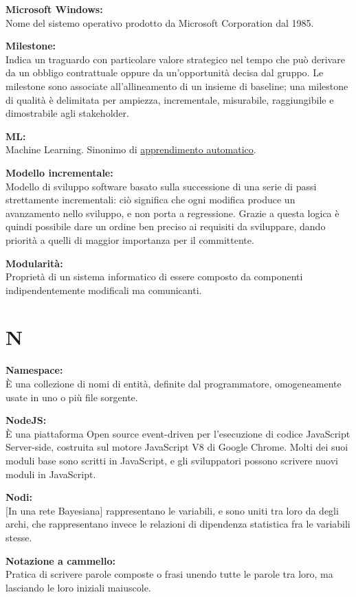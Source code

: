 \documentclass[a4paper, oneside, openany, dvipsnames, table]{article}
\begin{document}
\textbf{Microsoft Windows:}\\	Nome del sistemo operativo prodotto da Microsoft Corporation dal 1985.

\textbf{Milestone:}\\	Indica un traguardo con particolare valore strategico nel tempo che può derivare da un obbligo contrattuale oppure da un'opportunità decisa dal gruppo. Le milestone sono associate all'allineamento di un insieme di baseline; una milestone di qualità è delimitata per ampiezza, incrementale, misurabile, raggiungibile e dimostrabile agli stakeholder.

\textbf{ML:}\\Machine Learning. Sinonimo di \hyperref[par:appr_auto]{apprendimento automatico}.

\textbf{Modello incrementale:}\\	Modello di sviluppo software basato sulla successione di una serie di passi strettamente incrementali: ciò significa che ogni modifica produce un avanzamento nello sviluppo, e non porta a regressione. Grazie a questa logica è quindi possibile dare un ordine ben preciso ai requisiti da sviluppare, dando priorità a quelli di maggior importanza per il committente.

\textbf{Modularità:}\\	Proprietà di un sistema informatico di essere composto da componenti indipendentemente modificali ma comunicanti.


\newpage
\section{N}

\textbf{Namespace:} \\ \`E una collezione di nomi di entità, definite dal programmatore, omogeneamente usate in uno o più file sorgente.

\textbf{NodeJS:}\\	\`E una piattaforma Open source event-driven per l'esecuzione di codice JavaScript Server-side, costruita sul motore JavaScript V8 di Google Chrome. Molti dei suoi moduli base sono scritti in JavaScript, e gli sviluppatori possono scrivere nuovi moduli in JavaScript.

\textbf{Nodi:}\\ 
{[}In una rete Bayesiana{]} rappresentano le variabili, e sono uniti tra loro da degli archi, che rappresentano invece le relazioni di dipendenza statistica fra le variabili stesse.

\textbf{Notazione a cammello:}\\	Pratica di scrivere parole composte o frasi unendo tutte le parole tra loro, ma lasciando le loro iniziali maiuscole.
\end{document}
